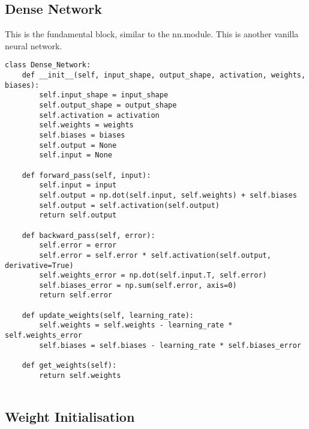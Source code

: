 \documentclass{article}
\begin{document}
\subsection{Dense Network}
This is the fundamental block, similar to the nn.module. This is another vanilla
neural network.

\begin{lstlisting}
class Dense_Network:
    def __init__(self, input_shape, output_shape, activation, weights, biases):
        self.input_shape = input_shape
        self.output_shape = output_shape
        self.activation = activation
        self.weights = weights
        self.biases = biases
        self.output = None
        self.input = None

    def forward_pass(self, input):
        self.input = input
        self.output = np.dot(self.input, self.weights) + self.biases
        self.output = self.activation(self.output)
        return self.output

    def backward_pass(self, error):
        self.error = error
        self.error = self.error * self.activation(self.output, derivative=True)
        self.weights_error = np.dot(self.input.T, self.error)
        self.biases_error = np.sum(self.error, axis=0)
        return self.error

    def update_weights(self, learning_rate):
        self.weights = self.weights - learning_rate * self.weights_error
        self.biases = self.biases - learning_rate * self.biases_error

    def get_weights(self):
        return self.weights


\end{lstlisting}

\clearpage


\subsection{Weight Initialisation}
\end{document}
